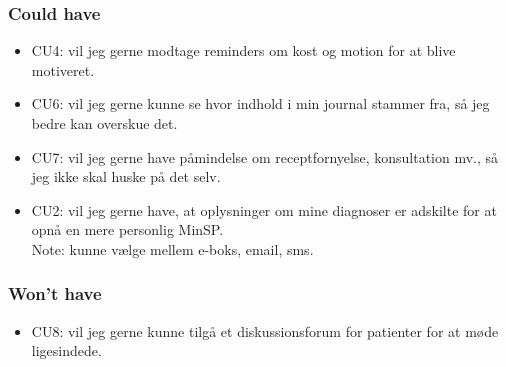 \subsubsection*{Could have}
\begin{itemize}
\item CU4: vil jeg gerne modtage reminders om kost og motion for at blive motiveret.
\item CU6: vil jeg gerne kunne se hvor indhold i min journal stammer fra, så jeg bedre kan overskue det.
\item CU7: vil jeg gerne have påmindelse om receptfornyelse, konsultation mv., så jeg ikke skal huske på det selv.
\item CU2: vil jeg gerne have, at oplysninger om mine diagnoser er adskilte for at opnå en mere personlig MinSP.\\
Note: kunne vælge mellem e-boks, email, sms.
\end{itemize}
\subsubsection*{Won't have}
\begin{itemize}
\item CU8: vil jeg gerne kunne tilgå et diskussionsforum for patienter for at møde ligesindede.
\end{itemize}
